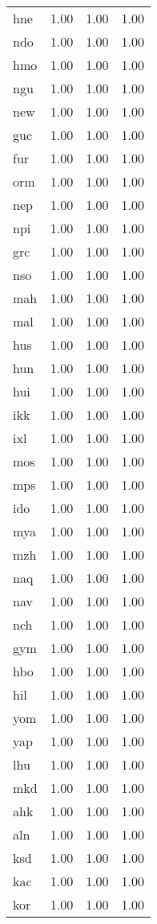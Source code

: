 \begin{table}
\begin{tabular}{lrrr}
hne & 1.00 & 1.00 & 1.00 \\
ndo & 1.00 & 1.00 & 1.00 \\
hmo & 1.00 & 1.00 & 1.00 \\
ngu & 1.00 & 1.00 & 1.00 \\
new & 1.00 & 1.00 & 1.00 \\
guc & 1.00 & 1.00 & 1.00 \\
fur & 1.00 & 1.00 & 1.00 \\
orm & 1.00 & 1.00 & 1.00 \\
nep & 1.00 & 1.00 & 1.00 \\
npi & 1.00 & 1.00 & 1.00 \\
grc & 1.00 & 1.00 & 1.00 \\
nso & 1.00 & 1.00 & 1.00 \\
mah & 1.00 & 1.00 & 1.00 \\
mal & 1.00 & 1.00 & 1.00 \\
hus & 1.00 & 1.00 & 1.00 \\
hun & 1.00 & 1.00 & 1.00 \\
hui & 1.00 & 1.00 & 1.00 \\
ikk & 1.00 & 1.00 & 1.00 \\
ixl & 1.00 & 1.00 & 1.00 \\
mos & 1.00 & 1.00 & 1.00 \\
mps & 1.00 & 1.00 & 1.00 \\
ido & 1.00 & 1.00 & 1.00 \\
mya & 1.00 & 1.00 & 1.00 \\
mzh & 1.00 & 1.00 & 1.00 \\
naq & 1.00 & 1.00 & 1.00 \\
nav & 1.00 & 1.00 & 1.00 \\
nch & 1.00 & 1.00 & 1.00 \\
gym & 1.00 & 1.00 & 1.00 \\
hbo & 1.00 & 1.00 & 1.00 \\
hil & 1.00 & 1.00 & 1.00 \\
yom & 1.00 & 1.00 & 1.00 \\
yap & 1.00 & 1.00 & 1.00 \\
lhu & 1.00 & 1.00 & 1.00 \\
mkd & 1.00 & 1.00 & 1.00 \\
ahk & 1.00 & 1.00 & 1.00 \\
aln & 1.00 & 1.00 & 1.00 \\
ksd & 1.00 & 1.00 & 1.00 \\
kac & 1.00 & 1.00 & 1.00 \\
kor & 1.00 & 1.00 & 1.00 \\

\end{tabular}
\end{table}
